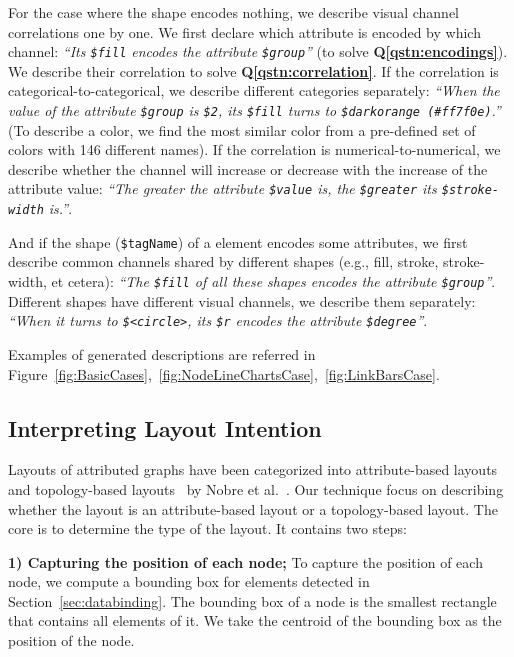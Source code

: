 For the case where the shape encodes nothing, we describe visual channel correlations one by one.
We first declare which attribute is encoded by which channel: \textit{``Its \texttt{\$fill} encodes the attribute \texttt{\$group}''} (to solve \textbf{Q\ref{qstn:encodings}}).
We describe their correlation to solve \textbf{Q\ref{qstn:correlation}}.
If the correlation is categorical-to-categorical, we describe different categories separately: \textit{``When the value of the attribute \texttt{\$group} is \texttt{\$2}, its \texttt{\$fill} turns to \texttt{\$darkorange (\#ff7f0e)}.''} (To describe a color, we find the most similar color from a pre-defined set of colors with 146 different names).
If the correlation is numerical-to-numerical, we describe whether the channel will increase or decrease with the increase of the attribute value: \textit{``The greater the attribute \texttt{\$value} is, the \texttt{\$greater} its \texttt{\$stroke-width} is.''}.

And if the shape (\texttt{\$tagName}) of a element encodes some attributes, we first describe common channels shared by different shapes (e.g., fill, stroke, stroke-width, et cetera): \textit{``The \texttt{\$fill} of all these shapes encodes the attribute \texttt{\$group}''}.
Different shapes have different visual channels, we describe them separately: \textit{``When it turns to \texttt{\$<circle>}, its \texttt{\$r} encodes the attribute \texttt{\$degree}''}.

Examples of generated descriptions are referred in Figure~\ref{fig:BasicCases},~\ref{fig:NodeLineChartsCase},~\ref{fig:LinkBarsCase}.

\subsection{Interpreting Layout Intention}
Layouts of attributed graphs have been categorized into attribute-based layouts~\cite{} and topology-based layouts~\cite{} by Nobre et al.~\cite{DBLP:journals/cgf/NobreMSL19}.
Our technique focus on describing whether the layout is an attribute-based layout or a topology-based layout.
The core is to determine the type of the layout.
It contains two steps: 

\textbf{1) Capturing the position of each node;} To capture the position of each node, we compute a bounding box for elements detected in Section~\ref{sec:databinding}.
The bounding box of a node is the smallest rectangle that contains all elements of it.
We take the centroid of the bounding box as the position of the node.

